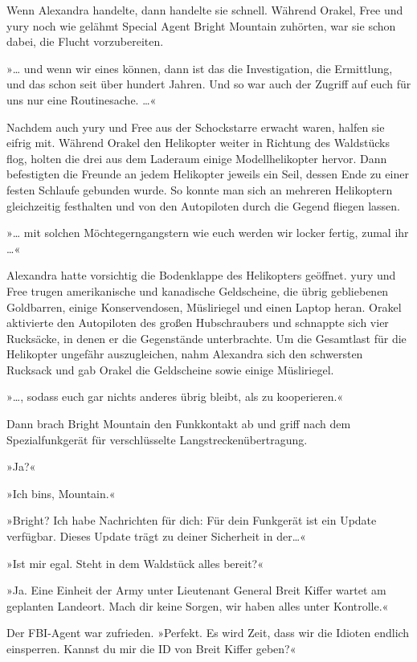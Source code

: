 Wenn Alexandra handelte, dann handelte sie schnell. Während Orakel, Free und yury noch wie gelähmt Special Agent Bright Mountain zuhörten, war sie schon dabei, die Flucht vorzubereiten.

»… und wenn wir eines können, dann ist das die Investigation, die Ermittlung, und das schon seit über hundert Jahren. Und so war auch der Zugriff auf euch für uns nur eine Routinesache. …«

Nachdem auch yury und Free aus der Schockstarre erwacht waren, halfen sie eifrig mit. Während Orakel den Helikopter weiter in Richtung des Waldstücks flog, holten die drei aus dem Laderaum einige Modellhelikopter hervor. Dann befestigten die Freunde an jedem Helikopter jeweils ein Seil, dessen Ende zu einer festen Schlaufe gebunden wurde. So konnte man sich an mehreren Helikoptern gleichzeitig festhalten und von den Autopiloten durch die Gegend fliegen lassen.

»… mit solchen Möchtegerngangstern wie euch werden wir locker fertig, zumal ihr …«

Alexandra hatte vorsichtig die Bodenklappe des Helikopters geöffnet. yury und Free trugen amerikanische und kanadische Geldscheine, die übrig gebliebenen Goldbarren, einige Konservendosen, Müsliriegel und einen Laptop heran. Orakel aktivierte den Autopiloten des großen Hubschraubers und schnappte sich vier Rucksäcke, in denen er die Gegenstände unterbrachte. Um die Gesamtlast für die Helikopter ungefähr auszugleichen, nahm Alexandra sich den schwersten Rucksack und gab Orakel die Geldscheine sowie einige Müsliriegel.

»…, sodass euch gar nichts anderes übrig bleibt, als zu kooperieren.«

Dann brach Bright Mountain den Funkkontakt ab und griff nach dem Spezialfunkgerät für verschlüsselte Langstreckenübertragung.

»Ja?«

»Ich bins, Mountain.«

»Bright? Ich habe Nachrichten für dich: Für dein Funkgerät ist ein Update verfügbar. Dieses Update trägt zu deiner Sicherheit in der…«

»Ist mir egal. Steht in dem Waldstück alles bereit?«

»Ja. Eine Einheit der Army unter Lieutenant General Breit Kiffer wartet am geplanten Landeort. Mach dir keine Sorgen, wir haben alles unter Kontrolle.«

Der FBI-Agent war zufrieden. »Perfekt. Es wird Zeit, dass wir die Idioten endlich einsperren. Kannst du mir die ID von Breit Kiffer geben?«

